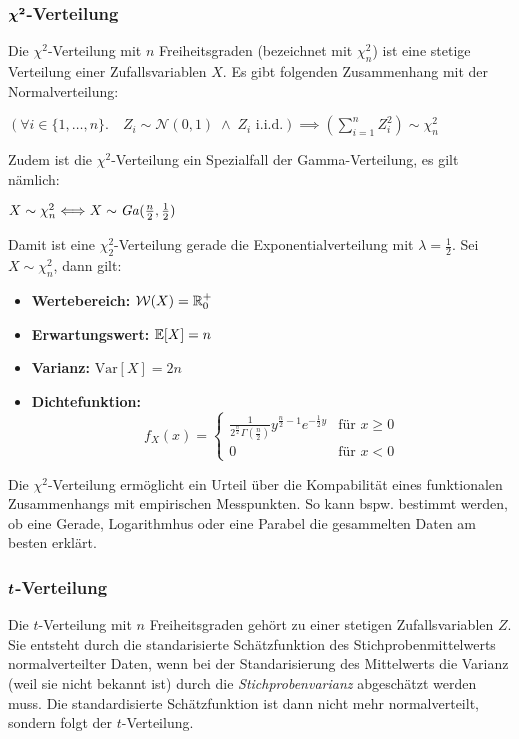 \subsubsection*{$\boldsymbol{\chi^2}$-Verteilung}
Die $\chi^2$-Verteilung mit $n$ Freiheitsgraden (bezeichnet mit $\chi_n^2$) ist eine stetige Verteilung einer Zufallsvariablen $X$. Es gibt folgenden Zusammenhang mit der Normalverteilung:
\begin{lemma}
$ (\forall i \in \{1,\dots, n\}. \quad Z_i \sim \mathcal{N}(0,1) \; \land \; Z_i \mbox{ i.i.d.}) \implies \left( \sum_{i=1}^n Z_i^2 \right) \sim \chi_n^2$
\end{lemma}
Zudem ist die $\chi^2$-Verteilung ein Spezialfall der Gamma-Verteilung, es gilt nämlich:
\begin{lemma}
$ X \sim \chi_n^2 \Longleftrightarrow X \sim \mathit{Ga}(\frac{n}{2}, \frac{1}{2})$
\end{lemma}
Damit ist eine $\chi_2^2$-Verteilung gerade die Exponentialverteilung mit $\lambda = \frac{1}{2}$. Sei $X  \sim \chi_n^2$, dann gilt:
\begin{itemize}
\item \textbf{Wertebereich:} $\mathcal{W}(X) = \mathbb{R}^+_0$
\item \textbf{Erwartungswert:} $\mathbb{E}[X] = n$
\item \textbf{Varianz:} $\mathrm{Var}[X] = 2n$
\item \textbf{Dichtefunktion:} $$ f_X(x) = \begin{cases} \frac{1}{2^{\frac{n}{2}} \Gamma(\frac{n}{2})} y^{\frac{n}{2}-1} e^{-\frac{1}{2}y} & \mbox{für } x \geq 0 \\ 0 & \mbox{für } x < 0 \end{cases}$$
\end{itemize}
Die $\chi^2$-Verteilung ermöglicht ein Urteil über die Kompabilität eines funktionalen Zusammenhangs mit empirischen Messpunkten. So kann bspw. bestimmt werden, ob eine Gerade, Logarithmhus oder eine Parabel die gesammelten Daten am besten erklärt. 
\subsubsection*{$\boldsymbol{t}$-Verteilung}
Die $t$-Verteilung mit $n$ Freiheitsgraden gehört zu einer stetigen Zufallsvariablen $Z$. Sie entsteht durch die standarisierte Schätzfunktion des Stichprobenmittelwerts normalverteilter Daten, wenn bei der Standarisierung des Mittelwerts die Varianz (weil sie nicht bekannt ist) durch die \textit{Stichprobenvarianz} abgeschätzt werden muss. Die standardisierte Schätzfunktion ist dann nicht mehr normalverteilt, sondern folgt der $t$-Verteilung. \\

